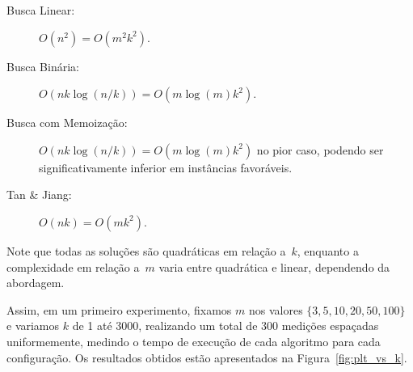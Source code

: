 \documentclass[11pt]{article}
\begin{document}
\begin{description}
	\item[Busca Linear:] \(O(n^2) = O(m^2 k^2)\).
	\item[Busca Binária:] \(O(nk \log (n/k)) = O(m \log(m) k^2)\).
	\item[Busca com Memoização:] \(O(nk \log (n/k)) = O(m \log(m) k^2)\) no pior caso, podendo ser significativamente inferior em instâncias favoráveis.
	\item[Tan \& Jiang:] \(O(nk) = O(m k^2)\).
\end{description}

Note que todas as soluções são quadráticas em relação a~\(k\), enquanto a complexidade em relação a~\(m\) varia entre quadrática e linear, dependendo da abordagem. 

Assim, em um primeiro experimento, fixamos \(m\) nos valores \(\{3, 5, 10, 20, 50, 100\}\) e variamos \(k\) de 1 até 3000, realizando um total de 300 medições espaçadas uniformemente, medindo o tempo de execução de cada algoritmo para cada configuração. Os resultados obtidos estão apresentados na Figura~\ref{fig:plt_vs_k}.
\end{document}
